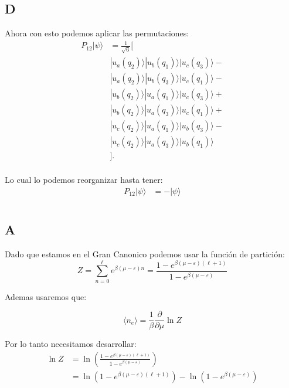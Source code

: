 \documentclass{report}
\begin{document}
\section{D}

Ahora con esto podemos aplicar las permutaciones:
\begin{align*}
  P_{12}| \psi \rangle &= \frac{1}{\sqrt{6}} [\\
  & | u_a (q_2)\rangle | u_b (q_1) \rangle | u_c (q_3) \rangle -\\
  &| u_a (q_2) \rangle | u_b (q_3) \rangle | u_c (q_1) \rangle -\\
  & | u_b (q_2)\rangle | u_a (q_1) \rangle | u_c (q_3) \rangle +\\
  &| u_b (q_2)\rangle | u_a (q_3) \rangle | u_c (q_1) \rangle +\\
  & | u_c (q_2)\rangle | u_a (q_1) \rangle | u_b (q_3) \rangle -\\
  &| u_c (q_2)\rangle| u_a (q_3) \rangle | u_b (q_1) \rangle\\
    &].\\
\end{align*}

Lo cual lo podemos reorganizar hasta tener:
\begin{align*}
  P_{12}| \psi \rangle &= - |\psi \rangle
\end{align*}


\chapter{}

\section{A}

Dado que estamos en el Gran Canonico podemos usar la función de partición:
$$
Z = \sum_{n = 0}^\ell e^{\beta \left(\mu - \varepsilon \right) n} = \frac{1 - e^{\beta (\mu - \varepsilon) (\ell + 1)}}{1 - e^{\beta(\mu - \varepsilon)}}
$$

Ademas usaremos que:

\[
  \langle n_e \rangle = \frac{1}{\beta} \frac{\partial}{\partial \mu} \ln Z
\]

Por lo tanto necesitamos desarrollar:
\begin{align*}
  \ln Z &= \ln \left( \frac{1 - e^{\beta (\mu - \varepsilon) (\ell + 1)}}{1 - e^{\beta(\mu - \varepsilon)}} \right)\\
  &= \ln \left( 1 - e^{\beta (\mu - \varepsilon) (\ell + 1)}\right) - \ln \left(1 - e^{\beta(\mu - \varepsilon)} \right)
\end{align*}
\end{document}
